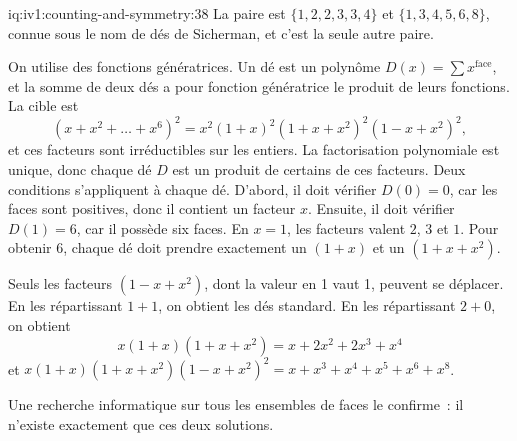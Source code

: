 \begin{solution}{iq:iv1:counting-and-symmetry:38}
La paire est $\{1, 2, 2, 3, 3, 4\}$ et $\{1, 3, 4, 5, 6, 8\}$, connue sous le nom de dés de Sicherman, et c'est la seule autre paire.

On utilise des fonctions génératrices. Un dé est un polynôme $D(x) = \sum x^{\text{face}}$, et la somme de deux dés a pour fonction génératrice le produit de leurs fonctions. La cible est
\[
(x + x^2 + \dots + x^6)^2 = x^2 (1 + x)^2 (1 + x + x^2)^2 (1 - x + x^2)^2,
\]
et ces facteurs sont irréductibles sur les entiers. La factorisation polynomiale est unique, donc chaque dé $D$ est un produit de certains de ces facteurs. Deux conditions s'appliquent à chaque dé. D'abord, il doit vérifier $D(0) = 0$, car les faces sont positives, donc il contient un facteur $x$. Ensuite, il doit vérifier $D(1) = 6$, car il possède six faces. En $x = 1$, les facteurs valent $2$, $3$ et $1$. Pour obtenir 6, chaque dé doit prendre exactement un $(1 + x)$ et un $(1 + x + x^2)$.

Seuls les facteurs $(1 - x + x^2)$, dont la valeur en 1 vaut 1, peuvent se déplacer. En les répartissant $1 + 1$, on obtient les dés standard. En les répartissant $2 + 0$, on obtient
\[
x(1 + x)(1 + x + x^2) = x + 2x^2 + 2x^3 + x^4
\]
et $x(1 + x)(1 + x + x^2)(1 - x + x^2)^2 = x + x^3 + x^4 + x^5 + x^6 + x^8$.

Une recherche informatique sur tous les ensembles de faces le confirme~: il n'existe exactement que ces deux solutions.

\end{solution}

